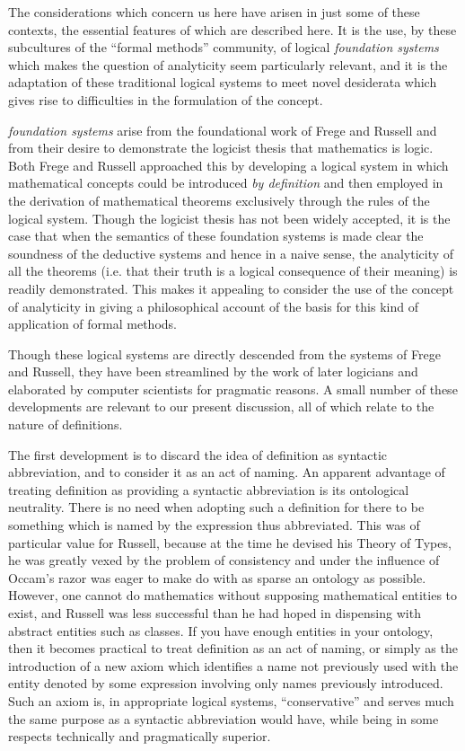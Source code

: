 \documentclass{rbjk}
\begin{document}
\begin{article}
The considerations which concern us here have arisen in just some of these contexts, the essential features of which are described here.
It is the use, by these subcultures of the ``formal methods'' community, of logical {\it foundation systems} which makes the question of analyticity seem particularly relevant, and it is the adaptation of these traditional logical systems to meet novel desiderata which gives rise to difficulties in the formulation of the concept.

{\it foundation systems} arise from the foundational work of Frege and Russell and from their desire to demonstrate the logicist thesis that mathematics is logic.
Both Frege and Russell approached this by developing a logical system in which mathematical concepts could be introduced {\it by definition} and then employed in the derivation of mathematical theorems exclusively through the rules of the logical system.
Though the logicist thesis has not been widely accepted, it is the case that when the semantics of these foundation systems is made clear the soundness of the deductive systems and hence in a naive sense, the analyticity of all the theorems (i.e. that their truth is a logical consequence of their meaning) is readily demonstrated.
This makes it appealing to consider the use of the concept of analyticity in giving a philosophical account of the basis for this kind of application of formal methods.

Though these logical systems are directly descended from the systems of Frege and Russell, they have been streamlined by the work of later logicians and elaborated by computer scientists for pragmatic reasons.
A small number of these developments are relevant to our present discussion, all of which relate to the nature of definitions.

The first development is to discard the idea of definition as syntactic abbreviation, and to consider it as an act of naming.
An apparent advantage of treating definition as providing a syntactic abbreviation is its ontological neutrality.
There is no need when adopting such a definition for there to be something which is named by the expression thus abbreviated.
This was of particular value for Russell, because at the time he devised his Theory of Types, he was greatly vexed by the problem of consistency and under the influence of Occam's razor was eager to make do with as sparse an ontology as possible.
However, one cannot do mathematics without supposing mathematical entities to exist, and Russell was less successful than he had hoped in dispensing with abstract entities such as classes.
If you have enough entities in your ontology, then it becomes practical to treat definition as an act of naming, or simply as the introduction of a new axiom which identifies a name not previously used with the entity denoted by some expression involving only names previously introduced.
Such an axiom is, in appropriate logical systems, ``conservative'' and serves much the same purpose as a syntactic abbreviation would have, while being in some respects technically and pragmatically superior.


\end{article}
\end{document}
